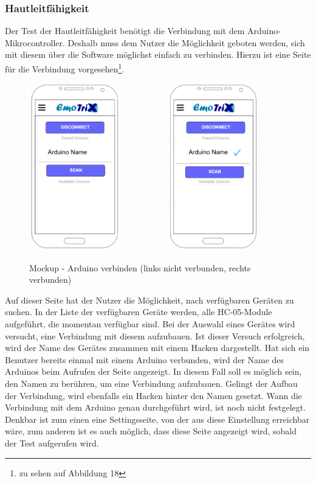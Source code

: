 \subsubsection{Hautleitfähigkeit}
Der Test der Hautleitfähigkeit benötigt die Verbindung mit dem Arduino-Mikrocontroller. Deshalb muss dem Nutzer die Möglichkeit geboten werden, sich mit diesem über die Software möglichst einfach zu verbinden. Hierzu ist eine Seite für die Verbindung vorgesehen\footnote{zu sehen auf Abbildung 18}. 
\begin{figure}[h]
	\centering
	\includegraphics[width=10cm]{Bilder/Mockup-Arduino-Connection.png}
	\label{img:Mockup-Arduino-Connection}
	\caption[Mockup - Arduino verbinden (links nicht verbunden, rechts verbunden)]{Mockup - Arduino verbinden (links nicht verbunden, rechts verbunden)}
\end{figure}%
Auf dieser Seite hat der Nutzer die Möglichkeit, nach verfügbaren Geräten zu suchen. In der Liste der verfügbaren Geräte werden, alle HC-05-Module aufgeführt, die momentan verfügbar sind. Bei der Auswahl eines Gerätes wird versucht, eine Verbindung mit diesem aufzubauen. Ist dieser Versuch erfolgreich, wird der Name des Gerätes zusammen mit einem Hacken dargestellt. Hat sich ein Benutzer bereits einmal mit einem Arduino verbunden, wird der Name des Arduinos beim Aufrufen der Seite angezeigt. In diesem Fall soll es möglich sein, den Namen zu berühren, um eine Verbindung aufzubauen. Gelingt der Aufbau der Verbindung, wird ebenfalls ein Hacken hinter den Namen gesetzt.\newline
Wann die Verbindung mit dem Arduino genau durchgeführt wird, ist noch nicht festgelegt. Denkbar ist zum einen eine Settingsseite, von der aus diese Einstellung erreichbar wäre, zum anderen ist es auch möglich, dass diese Seite angezeigt wird, sobald der Test aufgerufen wird.\newline

